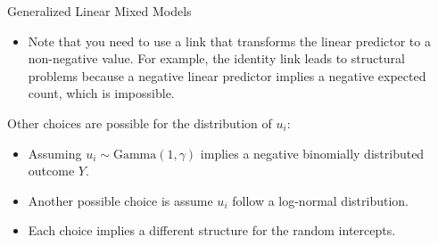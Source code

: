 \documentclass[ignorenonframetext,]{beamer}
\providecommand{\tightlist}{%
  \setlength{\itemsep}{0pt}\setlength{\parskip}{0pt}}
\begin{document}
\begin{frame}{Generalized Linear Mixed Models}
\protect\hypertarget{generalized-linear-mixed-models-1}{}

\begin{itemize}
\tightlist
\item
  Note that you need to use a link that transforms the linear predictor
  to a non-negative value. For example, the identity link leads to
  structural problems because a negative linear predictor implies a
  negative expected count, which is impossible.
\end{itemize}

Other choices are possible for the distribution of \(u_i\):

\begin{itemize}
\tightlist
\item
  Assuming \(u_i \sim \mathrm{Gamma}(1,\gamma)\) implies a negative
  binomially distributed outcome \(Y\).
\item
  Another possible choice is assume \(u_i\) follow a log-normal
  distribution.
\item
  Each choice implies a different structure for the random intercepts.
\end{itemize}

\end{frame}
\end{document}
